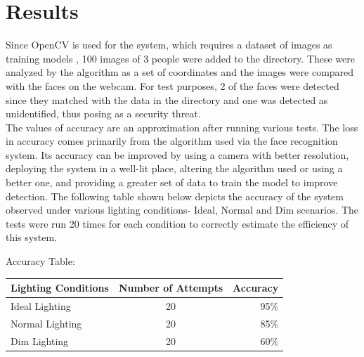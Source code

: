 \documentclass[conference]{IEEEtran}
\begin{document}
	\section{Results}
	Since OpenCV is used for the system, which requires a dataset of images as training models \cite{14}, 100 images of 3 people were added to the directory. These were analyzed by the algorithm as a set of coordinates and the images were compared with the faces on the webcam. For test purposes, 2 of the faces were detected since they matched with the data in the directory and one was detected as unidentified, thus posing as a security threat.\\
	The values of accuracy are an approximation after running various tests. The loss in accuracy comes primarily from the algorithm used via the face recognition system. Its accuracy can be improved by using a camera with better resolution, deploying the system in a well-lit place, altering the algorithm used or using a better one, and providing a greater set of data to train the model to improve detection. The following table shown below depicts the accuracy of the system observed under various lighting conditions- Ideal, Normal and Dim scenarios. The tests were run 20 times for each condition to correctly estimate the efficiency of this system. \\
	
	\begin{center}
		\begin{center}
			\caption{Accuracy Table:}
			\label{tab:}
			\begin{tabular}{l|c|r} %
				\textbf{Lighting Conditions} & \textbf{Number of Attempts} & \textbf{Accuracy}\\
				\hline
				Ideal Lighting & 20 & 95\% \\
				Normal Lighting & 20 & 85\% \\
				Dim Lighting & 20 & 60\% \\
			\end{tabular}
		\end{center}
		\label{tab:caption}
	\end{center}
	
	\hfill
\end{document}
